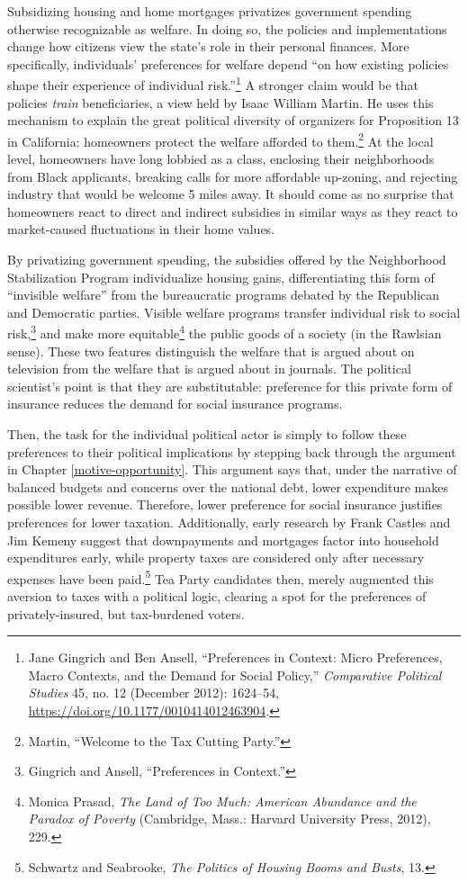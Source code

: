 \documentclass[12pt,oneside]{psthesis}
\begin{document}
Subsidizing housing and home mortgages privatizes government spending otherwise recognizable as welfare.
In doing so, the policies and implementations change how citizens view the state's role in their personal finances.
More specifically, individuals' preferences for welfare depend ``on how existing policies shape their experience of individual risk.''\footnote{Jane Gingrich and Ben Ansell, ``Preferences in Context: Micro Preferences, Macro Contexts, and the Demand for Social Policy,'' \emph{Comparative Political Studies} 45, no. 12 (December 2012): 1624--54, \url{https://doi.org/10.1177/0010414012463904}.}
A stronger claim would be that policies \emph{train} beneficiaries, a view held by Isaac William Martin.
He uses this mechanism to explain the great political diversity of organizers for Proposition 13 in California: homeowners protect the welfare afforded to them.\footnote{Martin, ``Welcome to the Tax Cutting Party.''}
At the local level, homeowners have long lobbied as a class, enclosing their neighborhoods from Black applicants, breaking calls for more affordable up-zoning, and rejecting industry that would be welcome 5 miles away.
It should come as no surprise that homeowners react to direct and indirect subsidies in similar ways as they react to market-caused fluctuations in their home values.

By privatizing government spending, the subsidies offered by the Neighborhood Stabilization Program individualize housing gains, differentiating this form of ``invisible welfare'' from the bureaucratic programs debated by the Republican and Democratic parties.
Visible welfare programs transfer individual risk to social risk,\footnote{Gingrich and Ansell, ``Preferences in Context.''} and make more equitable\footnote{Monica Prasad, \emph{The Land of Too Much: American Abundance and the Paradox of Poverty} (Cambridge, Mass.: Harvard University Press, 2012), 229.} the public goods of a society (in the Rawlsian sense).
These two features distinguish the welfare that is argued about on television from the welfare that is argued about in journals.
The political scientist's point is that they are substitutable: preference for this private form of insurance reduces the demand for social insurance programs.

Then, the task for the individual political actor is simply to follow these preferences to their political implications by stepping back through the argument in Chapter \ref{motive-opportunity}.
This argument says that, under the narrative of balanced budgets and concerns over the national debt, lower expenditure makes possible lower revenue.
Therefore, lower preference for social insurance justifies preferences for lower taxation.
Additionally, early research by Frank Castles and Jim Kemeny suggest that downpayments and mortgages factor into household expenditures early, while property taxes are considered only after necessary expenses have been paid.\footnote{Schwartz and Seabrooke, \emph{The Politics of Housing Booms and Busts}, 13.}
Tea Party candidates then, merely augmented this aversion to taxes with a political logic, clearing a spot for the preferences of privately-insured, but tax-burdened voters.
\end{document}
